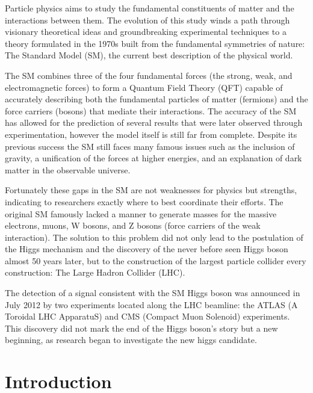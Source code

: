 \documentclass[12pt,a4paper,epsf,portrait,times,epsfig]{report}
\begin{document}
	Particle physics aims to study the fundamental constituents of matter and the interactions between them. The evolution of this study winds a path through visionary theoretical ideas and groundbreaking experimental techniques to a theory formulated in the 1970s built from the fundamental symmetries of nature: \newline The Standard Model (SM), the current best description of the physical world. \par


	The SM combines three of the four fundamental forces (the strong, weak, and electromagnetic forces) to form a Quantum Field Theory (QFT) capable of accurately describing both the fundamental particles of matter (fermions) and the force carriers (bosons) that mediate their interactions. The accuracy of the SM has allowed for the prediction of several results that were later observed through experimentation, %
	however the model itself is still far from complete. Despite its previous success the SM still faces many famous issues such as the inclusion of gravity, a unification of the forces at higher energies, and an explanation of dark matter in the observable universe. \par

	Fortunately these gaps in the SM are not weaknesses for physics but strengths, indicating to researchers exactly where to best coordinate their efforts. The original SM famously lacked a manner to generate masses for the massive electrons, muons, W bosons, and Z bosons (force carriers of the weak interaction). The solution to this problem did not only lead to the postulation of the Higgs mechanism and the discovery of the never before seen Higgs boson almost 50 years later, but to the construction of the largest particle collider every construction: The Large Hadron Collider (LHC). \par


	The detection of a signal consistent with the SM Higgs boson was announced in July 2012 by two experiments located along the LHC beamline: the ATLAS (A Toroidal LHC ApparatuS) and CMS (Compact Muon Solenoid) experiments. This discovery did not mark the end of the Higgs boson's story but a new beginning, as research began to investigate the new higgs candidate. 


	\chapter{Introduction}
	
\end{document}
